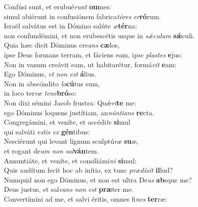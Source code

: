 \evenverse Confúsi sunt, et erubué\textit{runt} \textbf{om}nes:~\*\\
\evenverse simul abiérunt in confusiónem fabrica\textit{tó}\textit{res} \textit{er}\textbf{ró}rum.\\
\oddverse Israël salvátus est in Dómino salúte \textit{æ}\textbf{tér}na:~\*\\
\oddverse non confundémini, et non erubescétis usque in \textit{sǽ}\textit{cu}\textit{lum} \textbf{sǽ}culi.\\
\evenverse Quia hæc dicit Dóminus cre\textit{ans} \textbf{cæ}los,~\*\\
\evenverse ipse Deus formans terram, et fáciens eam, i\textit{pse} \textit{pla}\textit{stes} \textbf{e}jus:\\
\oddverse Non in vanum creávit eam, ut habitarétur, formá\textit{vit} \textbf{e}am:~\*\\
\oddverse Ego Dóminus, \textit{et} \textit{non} \textit{est} \textbf{á}lius.\\
\evenverse Non in abscóndito \textit{lo}\textbf{cú}tus sum,~\*\\
\evenverse in loco ter\textit{ræ} \textit{te}\textit{ne}\textbf{bró}so:\\
\oddverse Non dixi sémini Jacob frustra: Quǽ\textit{ri}\textbf{te} me:~\*\\
\oddverse ego Dóminus loquens justítiam, an\textit{nún}\textit{ti}\textit{ans} \textbf{re}cta.\\
\evenverse Congregámini, et veníte, et accédi\textit{te} \textbf{si}mul~\*\\
\evenverse qui salváti \textit{e}\textit{stis} \textit{ex} \textbf{gén}tibus:\\
\oddverse Nesciérunt qui levant lignum sculptú\textit{ræ} \textbf{su}æ,~\*\\
\oddverse et rogant de\textit{um} \textit{non} \textit{sal}\textbf{ván}tem.\\
\evenverse Annuntiáte, et veníte, et consiliámi\textit{ni} \textbf{si}mul:~\*\\
\evenverse Quis audítum fecit hoc ab inítio, ex tunc \textit{præ}\textit{dí}\textit{xit} \textbf{il}lud?\\
\oddverse Numquid non ego Dóminus, et non est ultra De\textit{us} \textbf{ab}sque me?~\*\\
\oddverse Deus justus, et sal\textit{vans} \textit{non} \textit{est} \textbf{præ}ter me.\\
\evenverse Convertímini ad me, et salvi éritis, omnes fi\textit{nes} \textbf{ter}ræ:~\*\\
